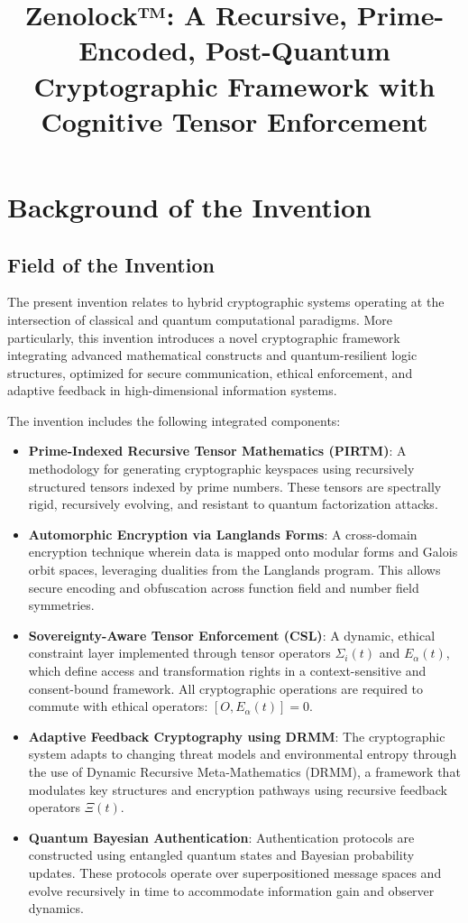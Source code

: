 \documentclass{article}
\title{\textbf{Zenolock™: A Recursive, Prime-Encoded, Post-Quantum Cryptographic Framework with Cognitive Tensor Enforcement}}
\theoremstyle{plain}
\begin{document}
\maketitle


\section{Background of the Invention}

\subsection{Field of the Invention}

The present invention relates to hybrid cryptographic systems operating at the intersection of classical and quantum computational paradigms. More particularly, this invention introduces a novel cryptographic framework integrating advanced mathematical constructs and quantum-resilient logic structures, optimized for secure communication, ethical enforcement, and adaptive feedback in high-dimensional information systems.

The invention includes the following integrated components:

\begin{itemize}
  \item \textbf{Prime-Indexed Recursive Tensor Mathematics (PIRTM)}: A methodology for generating cryptographic keyspaces using recursively structured tensors indexed by prime numbers. These tensors are spectrally rigid, recursively evolving, and resistant to quantum factorization attacks.

  \item \textbf{Automorphic Encryption via Langlands Forms}: A cross-domain encryption technique wherein data is mapped onto modular forms and Galois orbit spaces, leveraging dualities from the Langlands program. This allows secure encoding and obfuscation across function field and number field symmetries.

  \item \textbf{Sovereignty-Aware Tensor Enforcement (CSL)}: A dynamic, ethical constraint layer implemented through tensor operators $\Sigma_i(t)$ and $E_\alpha(t)$, which define access and transformation rights in a context-sensitive and consent-bound framework. All cryptographic operations are required to commute with ethical operators: $[O, E_\alpha(t)] = 0$.

  \item \textbf{Adaptive Feedback Cryptography using DRMM}: The cryptographic system adapts to changing threat models and environmental entropy through the use of Dynamic Recursive Meta-Mathematics (DRMM), a framework that modulates key structures and encryption pathways using recursive feedback operators $\Xi(t)$.

  \item \textbf{Quantum Bayesian Authentication}: Authentication protocols are constructed using entangled quantum states and Bayesian probability updates. These protocols operate over superpositioned message spaces and evolve recursively in time to accommodate information gain and observer dynamics.
\end{itemize}
\end{document}
